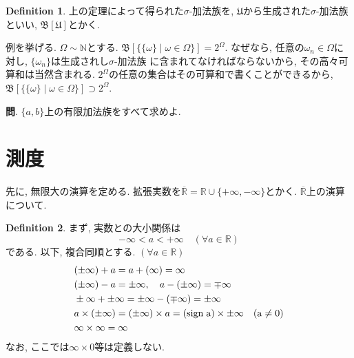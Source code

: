 \documentclass[a4j,dvipdfmx]{jsarticle}
\newcommand{\B}{\mathfrak{B}}
\newcommand{\Q}{\textbf{問}. }
\theoremstyle{definition}
\newtheorem{definition}{Definition}[section]
\theoremstyle{definition}
\numberwithin{equation}{section}
\begin{document}
            \begin{definition}
                上の定理によって得られた$\sigma$-加法族を, $\mathfrak{U}$から生成された$\sigma$-加法族といい, $\B[\mathfrak{U}]$とかく.
            \end{definition}

            例を挙げる. $\Omega\sim\mathbb{N}$とする. $\B[\{\{\omega\}\mid \omega\in\Omega\}]=2^\Omega$. なぜなら, 任意の$\omega_n \in \Omega$に対し, $\{\omega_n\}$は生成されし$\sigma$-加法族
            に含まれてなければならないから, その高々可算和は当然含まれる. $2^\Omega$の任意の集合はその可算和で書くことができるから, $\B[\{\{\omega\}\mid \omega\in\Omega\}]\supset 2^\Omega$.

            \Q $\{a,b\}$上の有限加法族をすべて求めよ.
        \clearpage
        \section{測度}
            先に, 無限大の演算を定める. 拡張実数を$\overline{\mathbb{R}}=\mathbb{R}\cup\{+\infty,-\infty\}$とかく. $\overline{\mathbb{R}}$上の演算について.
            \begin{definition}
                まず, 実数との大小関係は
                \begin{equation}
                    -\infty < a < + \infty \quad (\forall a\in \mathbb{R})
                \end{equation}
                である. 以下, 複合同順とする. $(\forall a\in \mathbb{R})$
                \begin{align}
                    &(\pm \infty) + a = a + (\infty) = \infty \\
                    &(\pm \infty) - a = \pm\infty,\quad a-(\pm \infty) = \mp \infty\\
                    &\pm\infty + \pm\infty = \pm\infty - (\mp\infty) = \pm\infty\\
                    &a\times (\pm\infty)=(\pm\infty)\times a = (\rm{sign}\hspace{1mm}a)\times \pm\infty \quad (a\neq 0)\\
                    &\infty \times \infty = \infty
                \end{align}
                なお, ここでは$\infty\times 0$等は定義しない.
            \end{definition}
\end{document}
